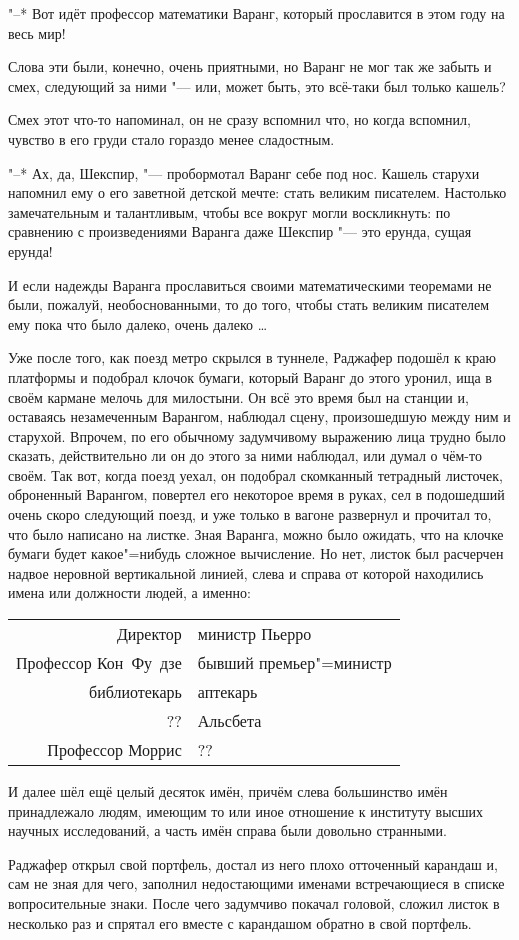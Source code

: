 "--* Вот идёт профессор математики Варанг, который прославится в этом году на
весь мир!

Слова эти были, конечно, очень приятными, но Варанг не мог так же забыть и смех,
следующий за ними "--- или, может быть, это всё-таки был только кашель?

Смех этот что-то напоминал, он не сразу вспомнил что, но когда вспомнил, чувство
в его груди стало гораздо менее сладостным.

"--* Ах, да, Шекспир, "--- пробормотал Варанг себе под нос.
Кашель старухи напомнил ему о его заветной детской мечте: стать великим
писателем.
Настолько замечательным и талантливым, чтобы все вокруг могли воскликнуть: по
сравнению с произведениями Варанга даже Шекспир "--- это ерунда, сущая ерунда!

И если надежды Варанга прославиться своими математическими теоремами не были,
пожалуй, необоснованными, то до того, чтобы стать великим писателем ему пока что
было далеко, очень далеко \ldots

Уже после того, как поезд метро скрылся в туннеле, Раджафер подошёл к краю
платформы и подобрал клочок бумаги, который Варанг до этого уронил, ища в своём
кармане мелочь для милостыни.
Он всё это время был на станции и, оставаясь незамеченным Варангом, наблюдал
сцену, произошедшую между ним и старухой.
Впрочем, по его обычному задумчивому выражению лица трудно было сказать,
действительно ли он до этого за ними наблюдал, или думал о чём-то своём.
Так вот, когда поезд уехал, он подобрал скомканный тетрадный листочек,
оброненный Варангом, повертел его некоторое время в руках, сел в подошедший
очень скоро следующий поезд, и уже только в вагоне развернул и прочитал то, что
было написано на листке.
Зная Варанга, можно было ожидать, что на клочке бумаги будет какое"=нибудь
сложное вычисление.
Но нет, листок был расчерчен надвое неровной вертикальной линией, слева и справа
от которой находились имена или должности людей, а именно:

\begin{table}[h!]
\centering
\begin{tabular}{r|l}
Директор             & министр Пьерро \\
Профессор Кон~Фу~дзе & бывший премьер"=министр \\
библиотекарь         & аптекарь \\
??                   & Альсбета \\
Профессор Моррис     & ?? \\
\end{tabular}
\end{table}

И далее шёл ещё целый десяток имён, причём слева большинство имён принадлежало
людям, имеющим то или иное отношение к институту высших научных исследований, а
часть имён справа были довольно странными.

Раджафер открыл свой портфель, достал из него плохо отточенный карандаш и, сам не
зная для чего, заполнил недостающими именами встречающиеся в списке
вопросительные знаки.
После чего задумчиво покачал головой, сложил листок в несколько раз и спрятал
его вместе с карандашом обратно в свой портфель.
